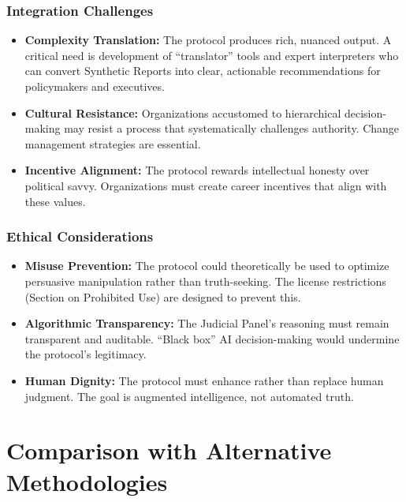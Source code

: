 \documentclass[11pt,a4paper]{article}
\begin{document}
\subsubsection{Integration Challenges}

\begin{itemize}[leftmargin=*]
    \item \textbf{Complexity Translation:} The protocol produces rich, nuanced output. A critical need is development of ``translator'' tools and expert interpreters who can convert Synthetic Reports into clear, actionable recommendations for policymakers and executives.
    
    \item \textbf{Cultural Resistance:} Organizations accustomed to hierarchical decision-making may resist a process that systematically challenges authority. Change management strategies are essential.
    
    \item \textbf{Incentive Alignment:} The protocol rewards intellectual honesty over political savvy. Organizations must create career incentives that align with these values.
\end{itemize}

\subsubsection{Ethical Considerations}

\begin{itemize}[leftmargin=*]
    \item \textbf{Misuse Prevention:} The protocol could theoretically be used to optimize persuasive manipulation rather than truth-seeking. The license restrictions (Section on Prohibited Use) are designed to prevent this.
    
    \item \textbf{Algorithmic Transparency:} The Judicial Panel's reasoning must remain transparent and auditable. ``Black box'' AI decision-making would undermine the protocol's legitimacy.
    
    \item \textbf{Human Dignity:} The protocol must enhance rather than replace human judgment. The goal is augmented intelligence, not automated truth.
\end{itemize}

\section{Comparison with Alternative Methodologies}
\end{document}
